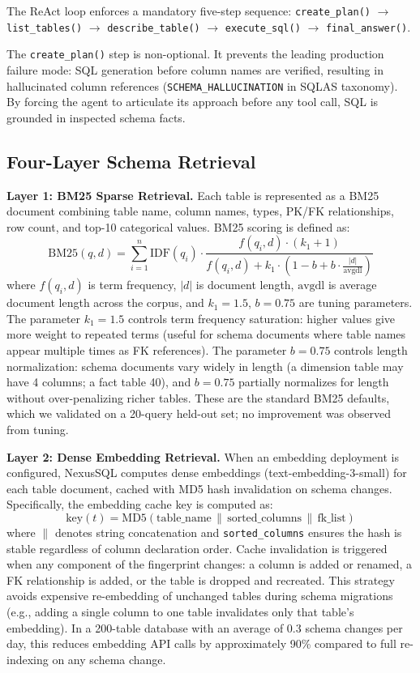 \documentclass[conference]{IEEEtran}
\begin{document}
The ReAct loop enforces a mandatory five-step sequence:
\texttt{create\_plan()} $\rightarrow$ \texttt{list\_tables()} $\rightarrow$
\texttt{describe\_table()} $\rightarrow$ \texttt{execute\_sql()} $\rightarrow$
\texttt{final\_answer()}.

The \texttt{create\_plan()} step is non-optional. It prevents the leading
production failure mode: SQL generation before column names are verified,
resulting in hallucinated column references (\texttt{SCHEMA\_HALLUCINATION} in
SQLAS taxonomy). By forcing the agent to articulate its approach before
any tool call, SQL is grounded in inspected schema facts.

\subsection{Four-Layer Schema Retrieval}

\textbf{Layer 1: BM25 Sparse Retrieval.}
Each table is represented as a BM25 document combining table name,
column names, types, PK/FK relationships, row count, and top-10
categorical values. BM25 scoring is defined as:
\begin{equation}
\text{BM25}(q, d) = \sum_{i=1}^{n} \text{IDF}(q_i) \cdot
  \frac{f(q_i, d) \cdot (k_1 + 1)}{f(q_i, d) + k_1 \cdot (1 - b + b \cdot \frac{|d|}{\text{avgdl}})}
\label{eq:bm25}
\end{equation}
where $f(q_i, d)$ is term frequency, $|d|$ is document length,
$\text{avgdl}$ is average document length across the corpus, and
$k_1 = 1.5$, $b = 0.75$ are tuning parameters.
The parameter $k_1 = 1.5$ controls term frequency saturation: higher
values give more weight to repeated terms (useful for schema documents
where table names appear multiple times as FK references). The parameter
$b = 0.75$ controls length normalization: schema documents vary widely
in length (a dimension table may have 4 columns; a fact table 40), and
$b = 0.75$ partially normalizes for length without over-penalizing
richer tables. These are the standard BM25 defaults, which we validated
on a 20-query held-out set; no improvement was observed from tuning.

\textbf{Layer 2: Dense Embedding Retrieval.}
When an embedding deployment is configured, NexusSQL computes
dense embeddings (text-embedding-3-small) for each table document,
cached with MD5 hash invalidation on schema changes. Specifically,
the embedding cache key is computed as:
\[
  \text{key}(t) = \text{MD5}\!\left(\text{table\_name} \,\|\,
    \text{sorted\_columns} \,\|\, \text{fk\_list}\right)
\]
where $\|$ denotes string concatenation and \texttt{sorted\_columns}
ensures the hash is stable regardless of column declaration order.
Cache invalidation is triggered when any component of the fingerprint
changes: a column is added or renamed, a FK relationship is added, or
the table is dropped and recreated. This strategy avoids expensive
re-embedding of unchanged tables during schema migrations (e.g., adding
a single column to one table invalidates only that table's embedding).
In a 200-table database with an average of 0.3 schema changes per day,
this reduces embedding API calls by approximately 90\% compared to
full re-indexing on any schema change.
\end{document}
